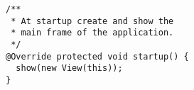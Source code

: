 \begin{verbatim}
/**
 * At startup create and show the 
 * main frame of the application.
 */
@Override protected void startup() {
  show(new View(this));
}    
\end{verbatim}

